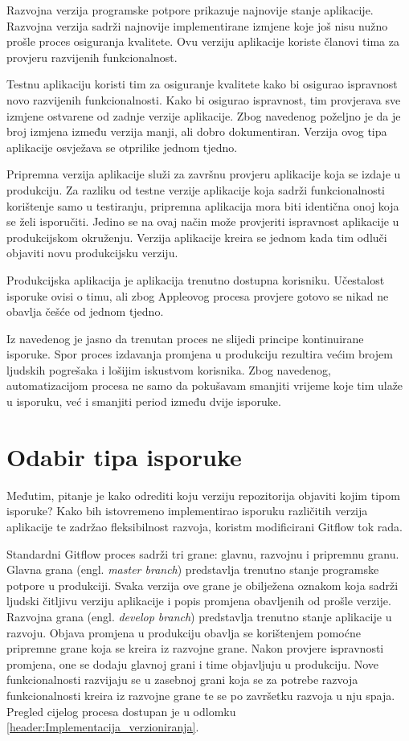 \documentclass[times, utf8, diplomski, numeric]{fer}
\newcommand{\eng}[1]{(engl. \textit{#1})}
\begin{document}
Razvojna verzija programske potpore prikazuje najnovije stanje aplikacije. Razvojna verzija sadrži najnovije implementirane izmjene koje još nisu nužno prošle proces osiguranja kvalitete. Ovu verziju aplikacije koriste članovi tima za provjeru razvijenih funkcionalnost.

Testnu aplikaciju koristi tim za osiguranje kvalitete kako bi osigurao ispravnost novo razvijenih funkcionalnosti. Kako bi osigurao ispravnost, tim provjerava sve izmjene ostvarene od zadnje verzije aplikacije. Zbog navedenog poželjno je da je broj izmjena između verzija manji, ali dobro dokumentiran. Verzija ovog tipa aplikacije osvježava se otprilike jednom tjedno.

Pripremna verzija aplikacije služi za završnu provjeru aplikacije koja se izdaje u produkciju. Za razliku od testne verzije aplikacije koja sadrži funkcionalnosti korištenje samo u testiranju, pripremna aplikacija mora biti identična onoj koja se želi isporučiti. Jedino se na ovaj način može provjeriti ispravnost aplikacije u produkcijskom okruženju. Verzija aplikacije kreira se jednom kada tim odluči objaviti novu produkcijsku verziju.

Produkcijska aplikacija je aplikacija trenutno dostupna korisniku. Učestalost isporuke ovisi o timu, ali zbog Appleovog procesa provjere gotovo se nikad ne obavlja češće od jednom tjedno.

Iz navedenog je jasno da trenutan proces ne slijedi principe kontinuirane isporuke. Spor proces izdavanja promjena u produkciju rezultira većim brojem ljudskih pogrešaka i lošijim iskustvom korisnika. Zbog navedenog, automatizacijom procesa ne samo da pokušavam smanjiti vrijeme koje tim ulaže u isporuku, već i smanjiti period između dvije isporuke.


\section{Odabir tipa isporuke}

Međutim, pitanje je kako odrediti koju verziju repozitorija objaviti kojim tipom isporuke? Kako bih istovremeno implementirao isporuku različitih verzija aplikacije te zadržao fleksibilnost razvoja, koristm modificirani Gitflow tok rada.

Standardni Gitflow proces sadrži tri grane: glavnu, razvojnu i pripremnu granu. Glavna grana \eng{master branch} predstavlja trenutno stanje programske potpore u produkciji. Svaka verzija ove grane je obilježena oznakom koja sadrži ljudski čitljivu verziju aplikacije i popis promjena obavljenih od prošle verzije. Razvojna grana \eng{develop branch} predstavlja trenutno stanje aplikacije u razvoju. Objava promjena u produkciju obavlja se korištenjem pomoćne pripremne grane koja se kreira iz razvojne grane. Nakon provjere ispravnosti promjena, one se dodaju glavnoj grani i time objavljuju u produkciju. Nove funkcionalnosti razvijaju se u zasebnoj grani koja se za potrebe razvoja funkcionalnosti kreira iz razvojne grane te se po završetku razvoja u nju spaja. Pregled cijelog procesa dostupan je u odlomku \ref{header:Implementacija_verzioniranja}.
\end{document}
